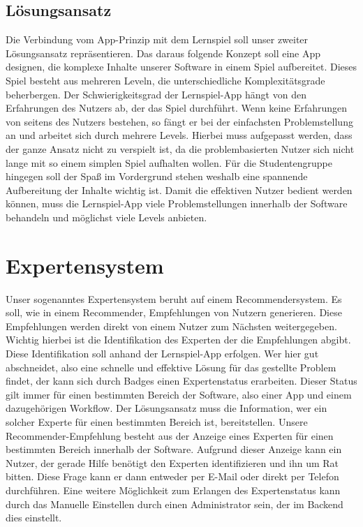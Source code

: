 \subsection{Lösungsansatz}
Die Verbindung vom App-Prinzip mit dem Lernspiel soll unser zweiter Lösungsansatz repräsentieren. Das daraus folgende Konzept soll eine App designen, die komplexe Inhalte unserer Software in einem Spiel aufbereitet. Dieses Spiel besteht aus mehreren Leveln, die unterschiedliche Komplexitätsgrade beherbergen. Der Schwierigkeitsgrad der Lernspiel-App hängt von den Erfahrungen des Nutzers ab, der das Spiel durchführt. Wenn keine Erfahrungen von seitens des Nutzers bestehen, so fängt er bei der einfachsten Problemstellung an und arbeitet sich durch mehrere Levels. Hierbei muss aufgepasst werden, dass der ganze Ansatz nicht zu verspielt ist, da die problembasierten Nutzer sich nicht lange mit so einem simplen Spiel aufhalten wollen. Für die Studentengruppe hingegen soll der Spaß im Vordergrund stehen weshalb eine spannende Aufbereitung der Inhalte wichtig ist. Damit die effektiven Nutzer bedient werden können, muss die Lernspiel-App viele Problemstellungen innerhalb der Software behandeln und möglichst viele Levels anbieten.


\section{Expertensystem}
Unser sogenanntes Expertensystem beruht auf einem Recommendersystem. Es soll, wie in einem Recommender, Empfehlungen von Nutzern generieren. Diese Empfehlungen werden direkt von einem Nutzer zum Nächsten weitergegeben. Wichtig hierbei ist die Identifikation des Experten der die Empfehlungen abgibt. Diese Identifikation soll anhand der Lernspiel-App erfolgen. Wer hier gut abschneidet, also eine schnelle und effektive Lösung für das gestellte Problem findet, der kann sich durch Badges einen Expertenstatus erarbeiten. Dieser Status gilt immer für einen bestimmten Bereich der Software, also einer App und einem dazugehörigen Workflow. Der Lösungsansatz muss die Information, wer ein solcher Experte für einen bestimmten Bereich ist, bereitstellen. Unsere Recommender-Empfehlung besteht aus der Anzeige eines Experten für einen bestimmten Bereich innerhalb der Software. Aufgrund dieser Anzeige kann ein Nutzer, der gerade Hilfe benötigt den Experten identifizieren und ihn um Rat bitten. Diese Frage kann er dann entweder per E-Mail oder direkt per Telefon durchführen. Eine weitere Möglichkeit zum Erlangen des Expertenstatus kann durch das Manuelle Einstellen durch einen Administrator sein, der im Backend dies einstellt.


